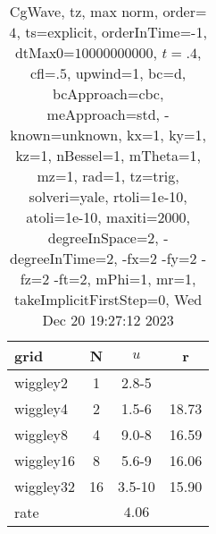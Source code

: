 \begin{table}[H]\tableFont %
\begin{center}
\begin{tabular}{|l|c|c|c|} \hline 
grid  & N &  $ u $ & r \\ \hline 
  wiggley2 &     1 & \num{2.8}{-5} &        \\ \hline
  wiggley4 &     2 & \num{1.5}{-6} & 18.73  \\ \hline
  wiggley8 &     4 & \num{9.0}{-8} & 16.59  \\ \hline
 wiggley16 &     8 & \num{5.6}{-9} & 16.06  \\ \hline
 wiggley32 &    16 & \num{3.5}{-10} & 15.90  \\ \hline
    rate             &       &  $4.06$       &       \\ \hline
\end{tabular}
\caption{CgWave, tz, max norm, order=$4$, ts=explicit, orderInTime=-1, dtMax0=$10000000000$, $t=.4$, cfl=$.5$, upwind=1, bc=d, bcApproach=cbc, meApproach=std, -known=unknown, kx=1, ky=1, kz=1, nBessel=1, mTheta=1, mz=1, rad=1, tz=trig, solveri=yale, rtoli=1e-10, atoli=1e-10, maxiti=2000, degreeInSpace=2, -degreeInTime=2, -fx=2 -fy=2 -fz=2 -ft=2, mPhi=1, mr=1, takeImplicitFirstStep=0, Wed Dec 20 19:27:12 2023}\label{table:tzOrder4max}
\end{center}
\end{table}
